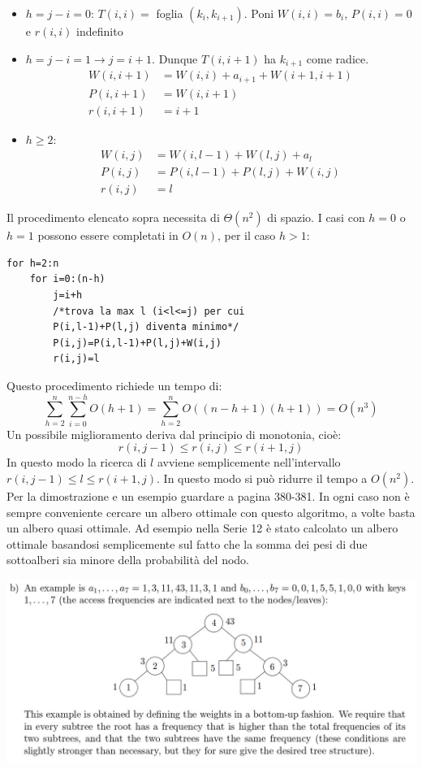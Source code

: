 \documentclass[a4paper]{book}
\newcommand{\lstIndent}{4}
\begin{document}
\begin{itemize}
\item $h=j-i=0$: $T(i,i)=$ foglia $(k_i, k_{i+1})$. Poni $W(i,i)=b_i$, $P(i,i)=0$ e $r(i,i)$ indefinito
\item $h=j-i=1 \rightarrow j=i+1$. Dunque $T(i,i+1)$ ha $k_{i+1}$ come radice. 
\begin{align*}
W(i,i+1)&=W(i,i)+a_{i+1}+W(i+1,i+1)\\
P(i,i+1)&=W(i,i+1)\\
r(i,i+1)&=i+1
\end{align*}
\item $h\geq 2$: 
\begin{align*}
W(i,j)&=W(i,l-1)+W(l,j)+a_l\\
P(i,j)&=P(i,l-1)+P(l,j)+W(i,j)\\
r(i,j)&=l
\end{align*}
\end{itemize}
Il procedimento elencato sopra necessita di $\Theta (n^2)$ di spazio. I casi con $h=0$ o $h=1$ possono essere completati in $O(n)$, per il caso $h>1$:
\begin{lstlisting}[tabsize=\lstIndent]
for h=2:n
	for i=0:(n-h)
		j=i+h
		/*trova la max l (i<l<=j) per cui
		P(i,l-1)+P(l,j) diventa minimo*/
		P(i,j)=P(i,l-1)+P(l,j)+W(i,j)
		r(i,j)=l		
\end{lstlisting}
Questo procedimento richiede un tempo di:
$$\sum_{h=2}^n \sum_{i=0}^{n-h} O(h+1)=\sum_{h=2}^n O((n-h+1)(h+1))= O(n^3)$$
Un possibile miglioramento deriva dal principio di monotonia, cioè:
$$r(i,j-1)\leq r(i,j) \leq r(i+1,j)$$
In questo modo la ricerca di $l$ avviene semplicemente nell'intervallo $r(i,j-1)\leq l \leq r(i+1,j)$. In questo modo si può ridurre il tempo a $O(n^2)$. Per la dimostrazione e un esempio guardare a pagina 380-381.
In ogni caso non è sempre conveniente cercare un albero ottimale con questo algoritmo, a volte basta un albero quasi ottimale. Ad esempio nella Serie 12 è stato calcolato un albero ottimale basandosi semplicemente sul fatto che la somma dei pesi di due sottoalberi sia minore della probabilità del nodo.
\begin{center}
\includegraphics[scale=0.3]{Figures/optimaltree.jpg}
\end{center} 
\end{document}
